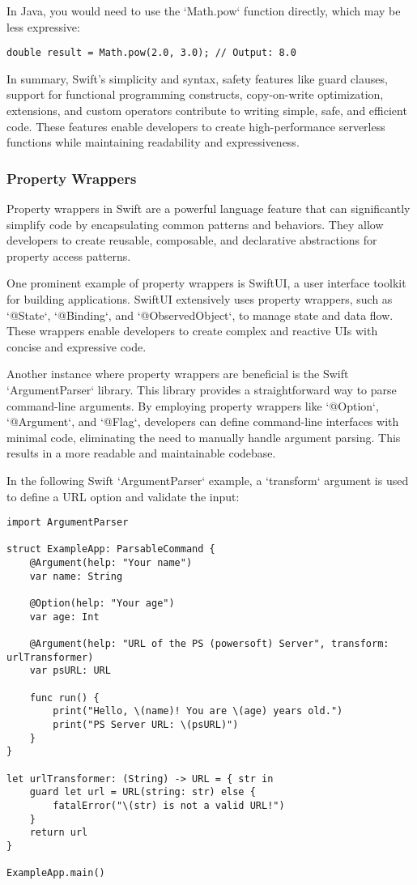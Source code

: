 In Java, you would need to use the `Math.pow` function directly, which may be less expressive:

\begin{verbatim}
double result = Math.pow(2.0, 3.0); // Output: 8.0
\end{verbatim}

In summary, Swift's simplicity and syntax, safety features like guard clauses, support for functional programming constructs, copy-on-write optimization, extensions, and custom operators contribute to writing simple, safe, and efficient code. These features enable developers to create high-performance serverless functions while maintaining readability and expressiveness.

\subsubsection{Property Wrappers}
Property wrappers in Swift are a powerful language feature that can significantly simplify code by encapsulating common patterns and behaviors. They allow developers to create reusable, composable, and declarative abstractions for property access patterns.

One prominent example of property wrappers is SwiftUI, a user interface toolkit for building applications. SwiftUI extensively uses property wrappers, such as `@State`, `@Binding`, and `@ObservedObject`, to manage state and data flow. These wrappers enable developers to create complex and reactive UIs with concise and expressive code.

Another instance where property wrappers are beneficial is the Swift `ArgumentParser` library. This library provides a straightforward way to parse command-line arguments. By employing property wrappers like `@Option`, `@Argument`, and `@Flag`, developers can define command-line interfaces with minimal code, eliminating the need to manually handle argument parsing. This results in a more readable and maintainable codebase.

In the following Swift `ArgumentParser` example, a `transform` argument is used to define a URL option and validate the input:

\begin{verbatim}
import ArgumentParser

struct ExampleApp: ParsableCommand {
    @Argument(help: "Your name")
    var name: String

    @Option(help: "Your age")
    var age: Int

    @Argument(help: "URL of the PS (powersoft) Server", transform: urlTransformer)
    var psURL: URL

    func run() {
        print("Hello, \(name)! You are \(age) years old.")
        print("PS Server URL: \(psURL)")
    }
}

let urlTransformer: (String) -> URL = { str in
    guard let url = URL(string: str) else {
        fatalError("\(str) is not a valid URL!")
    }
    return url
}

ExampleApp.main()
\end{verbatim}

